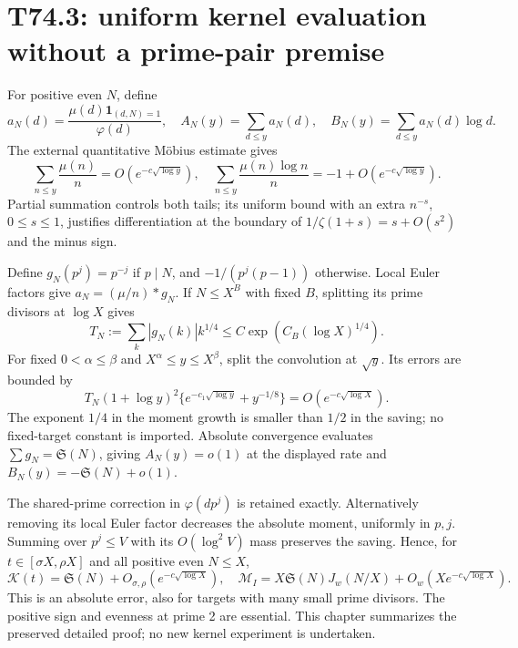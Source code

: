 \documentclass[11pt,a4paper]{article}
\newcommand{\Sg}{\mathfrak S}\newcommand{\e}{\mathrm e}
\begin{document}
\section{T74.3: uniform kernel evaluation without a prime-pair premise}
For positive even $N$, define
\[
 a_N(d)=\frac{\mu(d)\mathbf1_{(d,N)=1}}{\varphi(d)},\quad
 A_N(y)=\sum_{d\le y}a_N(d),\quad B_N(y)=\sum_{d\le y}a_N(d)\log d.
\]
The external quantitative M\"obius estimate gives
\[
 \sum_{n\le y}\frac{\mu(n)}n=O(e^{-c\sqrt{\log y}}),\quad
 \sum_{n\le y}\frac{\mu(n)\log n}{n}=-1+O(e^{-c\sqrt{\log y}}).
\]
Partial summation controls both tails; its uniform bound with an extra $n^{-s}$, $0\le s\le1$, justifies differentiation at the boundary of $1/\zeta(1+s)=s+O(s^2)$ and the minus sign.

Define $g_N(p^j)=p^{-j}$ if $p\mid N$, and $-1/(p^j(p-1))$ otherwise. Local Euler factors give $a_N=(\mu/n)*g_N$. If $N\le X^B$ with fixed $B$, splitting its prime divisors at $\log X$ gives
\[
 T_N:=\sum_k|g_N(k)|k^{1/4}\le C\exp(C_B(\log X)^{1/4}).
\]
For fixed $0<\alpha\le\beta$ and $X^\alpha\le y\le X^\beta$, split the convolution at $\sqrt y$. Its errors are bounded by
\[
 T_N(1+\log y)^2\{e^{-c_1\sqrt{\log y}}+y^{-1/8}\}
 =O(e^{-c\sqrt{\log X}}).
\]
The exponent $1/4$ in the moment growth is smaller than $1/2$ in the saving; no fixed-target constant is imported. Absolute convergence evaluates $\sum g_N=\Sg(N)$, giving $A_N(y)=o(1)$ at the displayed rate and $B_N(y)=-\Sg(N)+o(1)$.

The shared-prime correction in $\varphi(dp^j)$ is retained exactly. Alternatively removing its local Euler factor decreases the absolute moment, uniformly in $p,j$. Summing over $p^j\le V$ with its $O(\log^2V)$ mass preserves the saving. Hence, for $t\in[\sigma X,\rho X]$ and all positive even $N\le X$,
\[
 \mathcal K(t)=\Sg(N)+O_{\sigma,\rho}(e^{-c\sqrt{\log X}}),\quad
 \mathcal M_I=X\Sg(N)J_w(N/X)+O_w(Xe^{-c\sqrt{\log X}}).
\]
This is an absolute error, also for targets with many small prime divisors. The positive sign and evenness at prime 2 are essential. This chapter summarizes the preserved detailed proof; no new kernel experiment is undertaken.
\newpage
\end{document}
